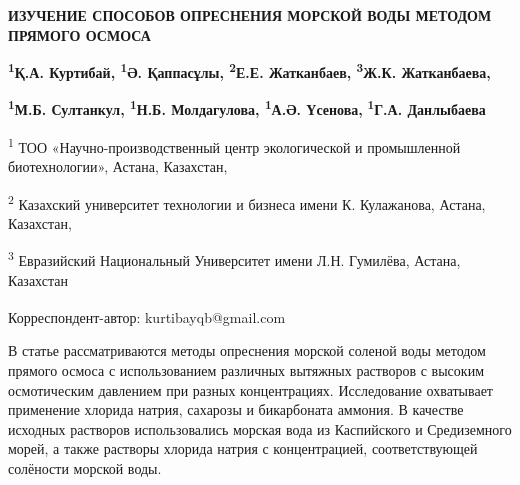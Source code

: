 
{\bfseries ИЗУЧЕНИЕ СПОСОБОВ ОПРЕСНЕНИЯ МОРСКОЙ ВОДЫ МЕТОДОМ ПРЯМОГО
ОСМОСА}

{\bfseries \textsuperscript{1}Қ.А. Куртибай}\textsuperscript{\envelope }{\bfseries ,
\textsuperscript{1}Ә. Қаппасұлы, \textsuperscript{2}Е.Е. Жатканбаев,
\textsuperscript{3}Ж.К. Жатканбаева,}

{\bfseries \textsuperscript{1}М.Б. Султанкул, \textsuperscript{1}Н.Б.
Молдагулова, \textsuperscript{1}А.Ә. Үсенова,}
{\bfseries \textsuperscript{1}Г.А. Данлыбаева}

\textsuperscript{1} ТОО «Научно-производственный центр экологической и
промышленной биотехнологии», Астана, Казахстан,

\textsuperscript{2} Казахский университет технологии и бизнеса имени К.
Кулажанова, Астана, Казахстан,

\textsuperscript{3} Евразийский Национальный Университет имени Л.Н.
Гумилёва, Астана, Казахстан

\textsuperscript{\envelope }Корреспондент-автор: kurtibayqb@gmail.com

В статье рассматриваются методы опреснения морской соленой воды методом
прямого осмоса с использованием различных вытяжных растворов с высоким
осмотическим давлением при разных концентрациях. Исследование охватывает
применение хлорида натрия, сахарозы и бикарбоната аммония. В качестве
исходных растворов использовались морская вода из Каспийского и
Средиземного морей, а также растворы хлорида натрия с концентрацией,
соответствующей солёности морской воды.

